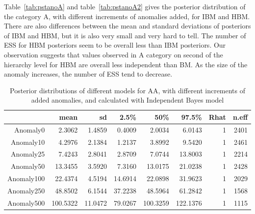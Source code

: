 Table~\ref{tab:pstanoA} and table~\ref{tab:pstanoA2} gives the posterior distribution of the category A, with different increments of anomalies added, for IBM and HBM. There are also differences between the mean and standard deviations of posteriors of IBM and HBM, but it is also very small and very hard to tell. The number of ESS for HBM posteriors seem to be overall less than IBM posteriors. Our observation suggests that values observed in A category on second of the hierarchy level for HBM are overall less independent than BM. As the size of the anomaly increases, the number of ESS tend to decrease. 

\newpage

\begin{table}[ht]
	\centering
	\begin{tabular}{rrrrrrrr}
		\hline
		& mean & sd & 2.5\% & 50\% & 97.5\% & Rhat & n.eff \\ 
		\hline
		Anomaly0 & 2.3062 & 1.4859 & 0.4009 & 2.0034 & 6.0143 & 1 & 2401 \\ 
		Anomaly10 & 4.2976 & 2.1384 & 1.2137 & 3.8992 & 9.5420 & 1 & 2461 \\ 
		Anomaly25 & 7.4243 & 2.8041 & 2.8709 & 7.0744 & 13.8003 & 1 & 2214\\ 
		Anomaly50 & 13.3455 & 3.5920 & 7.3160 & 13.0175 & 21.0238 & 1 & 2428 \\ 
		Anomaly100 & 22.4374 & 4.5194 & 14.6914 & 22.0898 & 31.9623 & 1 & 2029 \\ 
		Anomaly250 & 48.8502 & 6.1544 & 37.2238 & 48.5964 & 61.2842 & 1 & 1568 \\ 
		Anomaly500 & 100.5322 & 11.0472 & 79.0267 & 100.3259 & 122.1376 & 1 & 1115 \\ 
		\hline
	\end{tabular}
	\caption{Posterior distributions of different models for AA, with different increments of added anomalies, and calculated with Independent Bayes model} 
	\label{tab:pstanoAA}
\end{table}

